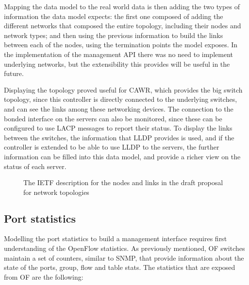 \par Mapping the data model to the real world data is then adding the two types of information the data model expects: the first one composed of adding the different
networks that composed the entire topology, including their nodes and network types; and then using the previous information to build the links between each of the
nodes, using the termination points the model exposes. In the implementation of the management API there was no need to implement underlying networks, but the
extensibility this provides will be useful in the future.

\par Displaying the topology proved useful for CAWR, which provides the big switch topology, since this controller is directly connected to the underlying switches, 
and can see the links among these networking devices. The connection to the bonded interface on the servers can also be monitored, since these can be configured to
use LACP messages to report their status. To display the links between the switches, the information that LLDP provides is used, and if the controller is extended
to be able to use LLDP to the servers, the further information can be filled into this data model, and provide a richer view on the status of each server.

\begin{figure} [h]
    \begin{subfigure}
    \texttt{[image: bisdn/ietf\_link]}
    \end{subfigure}
    \begin{subfigure}
    \texttt{[image: bisdn/ietf\_node]}
    \end{subfigure}
\caption{The IETF description for the nodes and links in the draft proposal for network topologies \cite{clemm_data_2017} }
\end{figure}

\subsection {Port statistics}

\par Modelling the port statistics to build a management interface requires first understanding of the OpenFlow statistics. As previously mentioned, OF switches 
maintain a set of counters, similar to SNMP, that provide information about the state of the ports, group, flow and table stats. The statistics that are exposed
from OF are the following:

